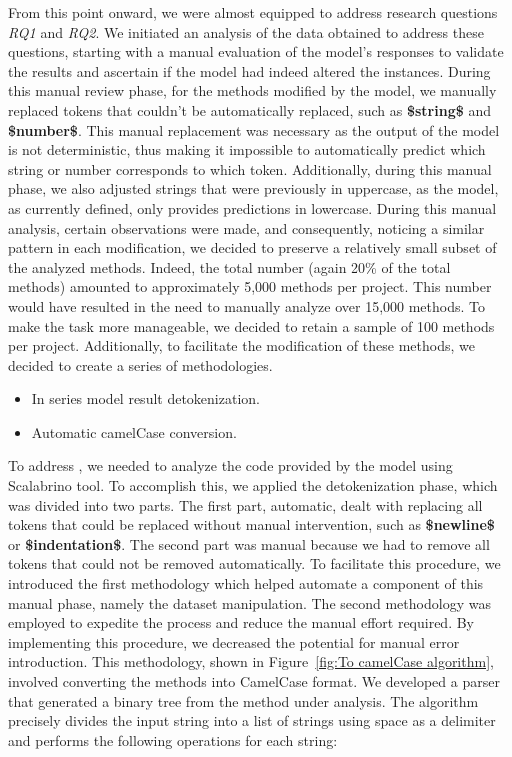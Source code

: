 From this point onward, we were almost equipped to address research questions \textit{RQ1} and \textit{RQ2}. We initiated an analysis of the data obtained to address these questions, starting with a manual evaluation of the model's responses to validate the results and ascertain if the model had indeed altered the instances. During this manual review phase, for the methods modified by the model, we manually replaced tokens that couldn't be automatically replaced, such as \textbf{\$string\$} and \textbf{\$number\$}. This manual replacement was necessary as the output of the model is not deterministic, thus making it impossible to automatically predict which string or number corresponds to which token. Additionally, during this manual phase, we also adjusted strings that were previously in uppercase, as the model, as currently defined, only provides predictions in lowercase.\newline
During this manual analysis, certain observations were made, and consequently, noticing a similar pattern in each modification, we decided to preserve a relatively small subset of the analyzed methods. Indeed, the total number (again 20\% of the total methods) amounted to approximately 5,000 methods per project. This number would have resulted in the need to manually analyze over 15,000 methods. To make the task more manageable, we decided to retain a sample of 100 methods per project. Additionally, to facilitate the modification of these methods, we decided to create a series of methodologies.
\begin{itemize}
	\item In series model result detokenization.
	\item Automatic camelCase conversion.
\end{itemize}
To address , we needed to analyze the code provided by the model using Scalabrino \etal \cite{Scalabrino2018} tool. To accomplish this, we applied the detokenization phase, which was divided into two parts. The first part, automatic, dealt with replacing all tokens that could be replaced without manual intervention, such as \textbf{\$newline\$} or \textbf{\$indentation\$}. The second part was manual because we had to remove all tokens that could not be removed automatically. To facilitate this procedure, we introduced the first methodology which helped automate a component of this manual phase, namely the dataset manipulation. The second methodology was employed to expedite the process and reduce the manual effort required. By implementing this procedure, we decreased the potential for manual error introduction. This methodology, shown in Figure~\ref{fig:To camelCase algorithm}, involved converting the methods into CamelCase format. We developed a parser that generated a binary tree from the method under analysis. The algorithm precisely divides the input string into a list of strings using space as a delimiter and performs the following operations for each string:

